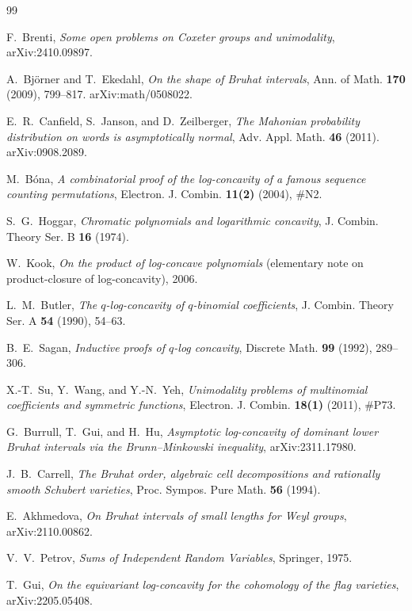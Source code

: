 \documentclass[11pt]{amsart}
\theoremstyle{plain}
\theoremstyle{definition}
\theoremstyle{remark}
\begin{document}
\begin{thebibliography}{99}

F.~Brenti, \emph{Some open problems on Coxeter groups and unimodality},
arXiv:2410.09897.

A.~Bj\"orner and T.~Ekedahl, \emph{On the shape of Bruhat intervals}, Ann. of
Math. \textbf{170} (2009), 799--817. arXiv:math/0508022.

E.~R.~Canfield, S.~Janson, and D.~Zeilberger, \emph{The Mahonian probability
distribution on words is asymptotically normal}, Adv. Appl. Math.
\textbf{46} (2011). arXiv:0908.2089.

M.~B\'ona, \emph{A combinatorial proof of the log-concavity of a famous
sequence counting permutations}, Electron. J. Combin. \textbf{11(2)} (2004),
\#N2.

S.~G.~Hoggar, \emph{Chromatic polynomials and logarithmic concavity}, J.
Combin. Theory Ser. B \textbf{16} (1974).

W.~Kook, \emph{On the product of log-concave polynomials} (elementary note
on product-closure of log-concavity), 2006.

L.~M.~Butler, \emph{The $q$-log-concavity of $q$-binomial coefficients}, J.
Combin. Theory Ser. A \textbf{54} (1990), 54--63.

B.~E.~Sagan, \emph{Inductive proofs of $q$-log concavity}, Discrete Math.
\textbf{99} (1992), 289--306.

X.-T.~Su, Y.~Wang, and Y.-N.~Yeh, \emph{Unimodality problems of multinomial
coefficients and symmetric functions}, Electron. J. Combin. \textbf{18(1)}
(2011), \#P73.

G.~Burrull, T.~Gui, and H.~Hu, \emph{Asymptotic log-concavity of dominant
lower Bruhat intervals via the Brunn--Minkowski inequality}, arXiv:2311.17980.

J.~B.~Carrell, \emph{The Bruhat order, algebraic cell decompositions and
rationally smooth Schubert varieties}, Proc. Sympos. Pure Math.
\textbf{56} (1994).

E.~Akhmedova, \emph{On Bruhat intervals of small lengths for Weyl groups},
arXiv:2110.00862.

V.~V.~Petrov, \emph{Sums of Independent Random Variables}, Springer, 1975.

T.~Gui, \emph{On the equivariant log-concavity for the cohomology of the
flag varieties}, arXiv:2205.05408.


\end{thebibliography}
\end{document}
